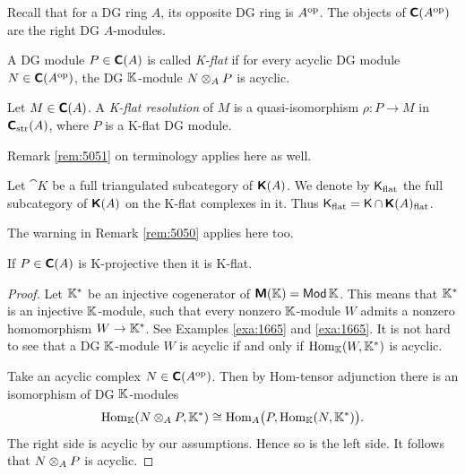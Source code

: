  \label{subsec:K-flat}

Recall that for a DG ring $A$, its opposite DG ring is $A^{\mathrm{op}}$.
The objects of $\boldsymbol{\mathsf{C}}(A^{\mathrm{op}})$ are the right DG $A$-modules. 

\begin{dfn} \label{dfn:1525}
A DG module $P \in \boldsymbol{\mathsf{C}}(A)$ is called 
{\em K-flat}%
if for every acyclic DG module $N \in \boldsymbol{\mathsf{C}}(A^{\mathrm{op}})$, the DG 
$\mathbb{K}$-module $N \otimes_A P$ is acyclic.
\end{dfn}

\begin{dfn} \label{dfn:4720}
Let $M \in \boldsymbol{\mathsf{C}}(A)$. A 
{\em K-flat resolution}%
of $M$ is a quasi-iso\-morphism $\rho : P \to M$ in 
$\boldsymbol{\mathsf{C}}_{\mathrm{str}}(A)$, where $P$ is a K-flat DG module. 
\end{dfn}

Remark \ref{rem:5051} on terminology applies here as well. 

\begin{dfn} \label{dfn:3145}
Let $\cat{K}$ be a full triangulated subcategory of $\operatorname{\boldsymbol{\mathsf{K}}}(A)$.
We denote by $\operatorname{\mathsf{K}}_{\mathrm{flat}}$ the full subcategory of 
$\operatorname{\boldsymbol{\mathsf{K}}}(A)$ on the K-flat complexes in it. 
Thus $\operatorname{\mathsf{K}}_{\mathrm{flat}} = \operatorname{\mathsf{K}} \cap \operatorname{\boldsymbol{\mathsf{K}}}(A)_{\mathrm{flat}}$.
\end{dfn}

The warning in Remark  \ref{rem:5050} applies here too. 

\begin{prop} \label{prop:1525}
If $P \in \boldsymbol{\mathsf{C}}(A)$ is K-projective then it is K-flat. 
\end{prop}

\begin{proof}
Let $\mathbb{K}^*$ be an injective cogenerator of $\boldsymbol{\mathsf{M}}(\mathbb{K}) = \operatorname{\mathsf{Mod}} \mathbb{K}$.
This means that $\mathbb{K}^*$ is an injective $\mathbb{K}$-module, such that every nonzero 
$\mathbb{K}$-module $W$ admits a nonzero homomorphism $W \to \mathbb{K}^*$. 
See Examples \ref{exa:1665} and \ref{exa:1665}. 
It is not hard to see that a DG $\mathbb{K}$-module $W$ is acyclic if and only if 
$\operatorname{Hom}_{\mathbb{K}}(W, \mathbb{K}^*)$ is acyclic. 

Take an acyclic complex $N \in \boldsymbol{\mathsf{C}}(A^{\mathrm{op}})$. Then by Hom-tensor 
adjunction there is an isomorphism of DG $\mathbb{K}$-modules
\[ \operatorname{Hom}_{\mathbb{K}}(N \otimes_A P, \mathbb{K}^*) \cong 
\operatorname{Hom}_{A} \bigl(P, \operatorname{Hom}_{\mathbb{K}}(N, \mathbb{K}^*) \bigr) . \]
The right side is acyclic by our assumptions. Hence so is the left side. It 
follows that $N \otimes_A P$ is acyclic. 
\end{proof}

